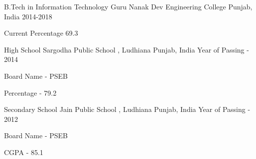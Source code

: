 


\begin{cventries}


\cventry
{B.Tech in Information Technology} %
{Guru Nanak Dev Engineering College} %
{Punjab, India} %
{2014-2018} %
{ %
\begin{cvitems}
\item {Current Percentage 69.3}
\end{cvitems}
}
 

\end{cventries}
\begin{cventries}


\cventry
{High School} %
{Sargodha Public School , Ludhiana} %
{Punjab, India} %
{Year of Passing - 2014} %
{ %
\begin{cvitems}
\item {Board Name - PSEB}
\item {Percentage - 79.2}
\end{cvitems}}
\end{cventries}
\begin{cventries}

\cventry
{Secondary School} %
{Jain Public School , Ludhiana} %
{Punjab, India} %
{Year of Passing - 2012} %
{ %
\begin{cvitems}
\item {Board Name - PSEB}
\item {CGPA - 85.1}
\end{cvitems}
}
 

\end{cventries}